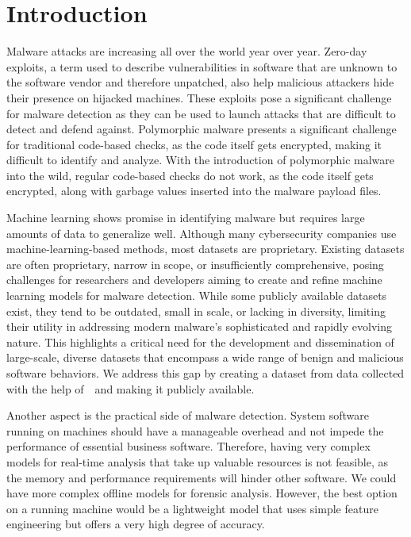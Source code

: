 \section{Introduction}
\label{sec:introduction}
Malware attacks are increasing all over the world year over year\cite{av_test_statistics}. 
Zero-day exploits, a term used to describe vulnerabilities in software that are unknown to the software vendor and therefore unpatched, also help malicious attackers hide their presence on hijacked machines. 
These exploits pose a significant challenge for malware detection as they can be used to launch attacks that are difficult to detect and defend against. 
Polymorphic malware presents a significant challenge for traditional code-based checks, as the code itself gets encrypted, making it difficult to identify and analyze.
With the introduction of polymorphic malware into the wild, regular code-based checks do not work, as the code itself gets encrypted, along with garbage values inserted into the malware payload files.

Machine learning shows promise in identifying malware but requires large amounts of data to generalize well. 
Although many cybersecurity companies use machine-learning-based methods, most datasets are proprietary. 
Existing datasets are often proprietary, narrow in scope, or insufficiently comprehensive, posing challenges for researchers and developers aiming to create and refine machine learning models for malware detection. 
While some publicly available datasets exist, they tend to be outdated, small in scale, or lacking in diversity, limiting their utility in addressing modern malware's sophisticated and rapidly evolving nature. 
This highlights a critical need for the development and dissemination of large-scale, diverse datasets that encompass a wide range of benign and malicious software behaviors. 
We address this gap by creating a dataset from data collected with the help of~\gdata~and making it publicly available.

Another aspect is the practical side of malware detection. 
System software running on machines should have a manageable overhead and not impede the performance of essential business software.
Therefore, having very complex models for real-time analysis that take up valuable resources is not feasible, as the memory and performance requirements will hinder other software.
We could have more complex offline models for forensic analysis. However, the best option on a running machine would be a lightweight model that uses simple feature engineering but offers a very high degree of accuracy.

